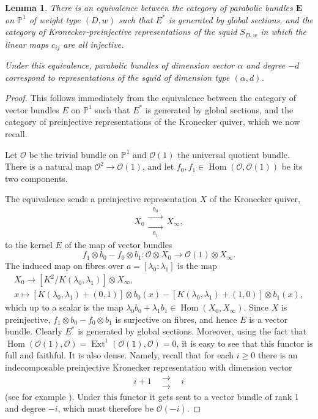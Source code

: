 \documentclass{amsart}
\theoremstyle{plain}
\newtheorem{lem}[thm]{Lemma}
\theoremstyle{definition}
\theoremstyle{remark}
\newcommand{\PP}{\mathbb{P}}
\DeclareMathOperator{\Hom}{Hom}
\DeclareMathOperator{\Ext}{Ext}
\newcommand{\OO}{\mathcal{O}}
\newcommand{\E}{\mathbf{E}}
\begin{document}
\begin{lem}\label{l:pbsquidequiv}
There is an equivalence between the category of parabolic bundles
$\E$ on $\PP^1$ of weight type $(D,w)$
such that $E^*$ is generated by global sections, and the category of
Kronecker-preinjective representations of the squid $S_{D,w}$ in which
the linear maps $c_{ij}$ are all injective.

Under this equivalence, parabolic bundles of dimension vector $\alpha$
and degree $-d$ correspond to representations of the squid of
dimension type $(\alpha,d)$.
\end{lem}


\begin{proof}
This follows immediately from the equivalence between the
category of vector bundles $E$ on $\PP^1$ such that $E^*$ is generated by global sections,
and the category of preinjective representations of the Kronecker quiver,
which we now recall.

Let $\OO$ be the trivial bundle on $\PP^1$ and $\OO(1)$
the universal quotient bundle. There is a natural map $\OO^2\to\OO(1)$, and
let $f_0,f_1\in\Hom(\OO,\OO(1))$ be its two components.

The equivalence sends a preinjective representation $X$
of the Kronecker quiver,
\[
X_0
\begin{matrix} \xrightarrow{\;\;\; b_0\;\;\;} \\ \xrightarrow[\;\;\;b_1\;\;\;]{} \end{matrix}
X_\infty,
\]
to the kernel $E$ of the map of vector bundles
\[
f_1\otimes b_0 - f_0\otimes b_1 : \OO\otimes X_0 \to \OO(1)\otimes X_\infty.
\]
The induced map on fibres over $a = [\lambda_0:\lambda_1]$ is the map
%
\begin{gather*}
X_0 \to [K^2/K(\lambda_0,\lambda_1)] \otimes X_\infty,
\\
x \mapsto [K(\lambda_0,\lambda_1) + (0,1)]\otimes b_0(x) - [K(\lambda_0,\lambda_1) + (1,0)]\otimes b_1(x),
\end{gather*}
%
which up to a scalar is
the map $\lambda_0 b_0 + \lambda_1 b_1 \in\Hom(X_0,X_\infty)$.
Since $X$ is preinjective, $f_1\otimes b_0 - f_0\otimes b_1$ is surjective on fibres,
and hence $E$ is a vector bundle. Clearly $E^*$ is generated
by global sections. Moreover, using the fact that $\Hom(\OO(1),\OO)=\Ext^1(\OO(1),\OO)=0$,
it is easy to see that this functor is full and faithful. It is also
dense. Namely, recall that for each $i\ge 0$ there is an indecomposable
preinjective Kronecker representation with dimension vector
\[
i+1
\;\;\;
\begin{matrix} \longrightarrow \\ \longrightarrow \end{matrix}
\;\;\;
i
\]
(see for example \cite[\S 3.2]{Ringel}).
Under this functor it gets sent to a vector bundle of rank 1 and
degree $-i$, which must therefore be $\OO(-i)$.


\end{proof}
\end{document}
